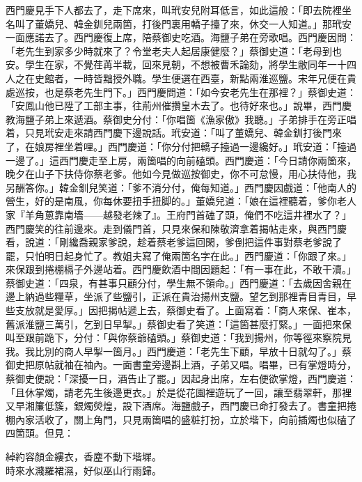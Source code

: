 西門慶見手下人都去了，走下席來，叫玳安兒附耳低言，如此這般：「即去院裡坐名叫了董嬌兒、韓金釧兒兩箇，打後門裏用轎子擡了來，休交一人知道。」那玳安一面應諾去了。西門慶復上席，陪蔡御史吃酒。海鹽子弟在旁歌唱。西門慶因問：「老先生到家多少時就來了？令堂老夫人起居康健麼？」蔡御史道：「老母到也安。學生在家，不覺荏苒半載，回來見朝，不想被曹禾論劾，將學生敝同年一十四人之在史館者，一時皆黜授外職。{}學生便選在西臺，新點兩淮巡鹽。宋年兄便在貴處巡按，也是蔡老先生門下。」西門慶問道：「如今安老先生在那裡？」蔡御史道：「安鳳山他已陞了工部主事，往荊州催攢皇木去了。也待好來也。」說畢，西門慶教海鹽子弟上來遞酒。蔡御史分付：「你唱箇《漁家傲》我聽。」子弟排手在旁正唱着，只見玳安走來請西門慶下邊說話。玳安道：「叫了董嬌兒、韓金釧打後門來了，在娘房裡坐着哩。」西門慶道：「你分付把轎子擡過一邊纔好。」玳安道：「擡過一邊了。」這西門慶走至上房，兩箇唱的向前磕頭。西門慶道：「今日請你兩箇來，晚夕在山子下扶侍你蔡老爹。他如今見做巡按御史，你不可怠慢，用心扶侍他，我另酬答你。」韓金釧兒笑道：「爹不消分付，俺每知道。」西門慶因戲道：「他南人的營生，好的是南風，你每休要扭手扭脚的。」董嬌兒道：「娘在這裡聽着，爹你老人家『羊角蔥靠南墻——越發老辣了』。王府門首磕了頭，俺們不吃這井裡水了？」西門慶笑的往前邊來。走到儀門首，只見來保和陳敬濟拿着揭帖走來，與西門慶看，說道：「剛纔喬親家爹說，趁着蔡老爹這回閑，爹倒把這件事對蔡老爹說了罷，只怕明日起身忙了。教姐夫寫了俺兩箇名字在此。」西門慶道：「你跟了來。」來保跟到捲棚槅子外邊站着。西門慶飲酒中間因題起：「有一事在此，不敢干瀆。」蔡御史道：「四泉，有甚事只顧分付，學生無不領命。」西門慶道：「去歲因舍親在邊上納過些糧草，坐派了些鹽引，正派在貴治揚州支鹽。望乞到那裡青目青目，早些支放就是愛厚。」因把揭帖遞上去，蔡御史看了。上面寫着：「商人來保、崔本，舊派淮鹽三萬引，乞到日早掣。」蔡御史看了笑道：「這箇甚麼打緊。」一面把來保叫至跟前跪下，分付：「與你蔡爺磕頭。」蔡御史道：「我到揚州，你等徑來察院見我。我比別的商人早掣一箇月。」西門慶道：「老先生下顧，早放十日就勾了。」蔡御史把原帖就袖在袖內。一面書童旁邊斟上酒，子弟又唱。唱畢，已有掌燈時分，蔡御史便說：「深擾一日，酒告止了罷。」因起身出席，左右便欲掌燈，西門慶道：「且休掌燭，請老先生後邊更衣。」於是從花園裡遊玩了一回，讓至翡翠軒，那裡又早湘簾低簇，銀燭熒煌，設下酒席。海鹽戲子，西門慶已命打發去了。書童把捲棚內家活收了，關上角門，只見兩箇唱的盛粧打扮，立於堦下，向前插燭也似磕了四箇頭。但見：

\begin{myquote} 
綽約容顏金縷衣，香塵不動下堦墀。\\時來水濺羅裙濕，好似巫山行雨歸。
\end{myquote} 

